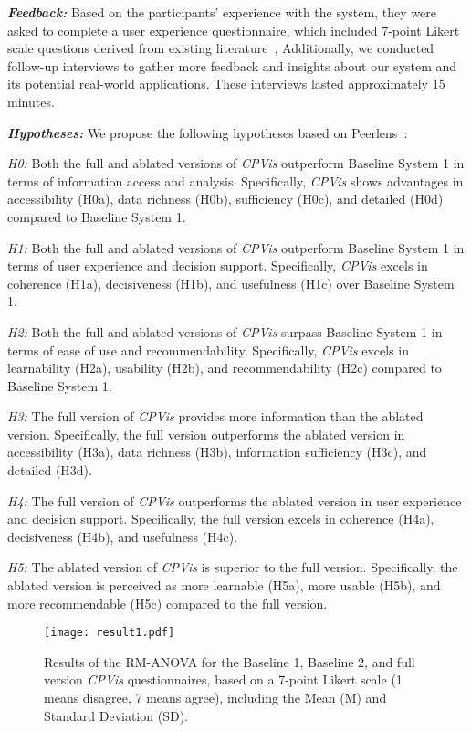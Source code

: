 \textbf{\textit{Feedback:}} Based on the participants' experience with the system, they were asked to complete a user experience questionnaire, which included 7-point Likert scale questions derived from existing literature~\cite{xia2019peerlens,shi2018meetingvis},  Additionally, we conducted follow-up interviews to gather more feedback and insights about our system and its potential real-world applications. These interviews lasted approximately 15 minutes.

\textbf{\textit{Hypotheses:}}
We propose the following hypotheses based on Peerlens~\cite{xia2019peerlens}:

\textit{H0: }Both the full and ablated versions of \textit{CPVis} outperform Baseline System 1 in terms of information access and analysis. Specifically, \textit{CPVis} shows advantages in accessibility (H0a), data richness (H0b), sufficiency (H0c), and detailed (H0d) compared to Baseline System 1.

\textit{H1: }Both the full and ablated versions of \textit{CPVis} outperform Baseline System 1 in terms of user experience and decision support. Specifically, \textit{CPVis} excels in coherence (H1a), decisiveness (H1b), and usefulness (H1c) over Baseline System 1.

\textit{H2: }Both the full and ablated versions of \textit{CPVis} surpass Baseline System 1 in terms of ease of use and recommendability. Specifically, \textit{CPVis} excels in learnability (H2a), usability (H2b), and recommendability (H2c) compared to Baseline System 1.

\textit{H3: }The full version of \textit{CPVis} provides more information than the ablated version. Specifically, the full version outperforms the ablated version in accessibility (H3a), data richness (H3b), information sufficiency (H3c), and detailed (H3d).

\textit{H4: }The full version of \textit{CPVis} outperforms the ablated version in user experience and decision support. Specifically, the full version excels in coherence (H4a), decisiveness (H4b), and usefulness (H4c).

\textit{H5: }The ablated version of \textit{CPVis} is superior to the full version. Specifically, the ablated version is perceived as more learnable (H5a), more usable (H5b), and more recommendable (H5c) compared to the full version.
\begin{figure*}
	\centering
	\texttt{[image: result1.pdf]}
	\caption{Results of the RM-ANOVA for the Baseline 1, Baseline 2, and full version \textit{CPVis} questionnaires, based on a 7-point Likert scale (1 means disagree, 7 means agree), including the Mean (M) and Standard Deviation (SD).}
	\label{fig:result}
\end{figure*}
